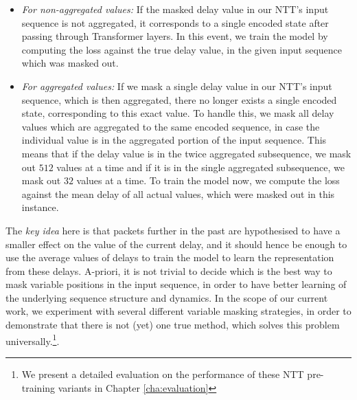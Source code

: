 \begin{itemize}
\item \emph{For non-aggregated values:} If the masked delay value in our NTT's input sequence is not aggregated, it corresponds to a single encoded state after passing through Transformer layers. In this event, we train the model by computing the loss against the true delay value, in the given input sequence which was masked out.
\item \emph{For aggregated values:} If we mask a single delay value in our NTT's input sequence, which is then aggregated, there no longer exists a single encoded state, corresponding to this exact value. To handle this, we mask all delay values which are aggregated to the same encoded sequence, in case the individual value is in the aggregated portion of the input sequence. This means that if the delay value is in the twice aggregated subsequence, we mask out $512$ values at a time and if it is in the single aggregated subsequence, we mask out $32$ values at a time. To train the model now, we compute the loss against the mean delay of all actual values, which were masked out in this instance.
\end{itemize}

The \emph{key idea} here is that packets further in the past are hypothesised to have a smaller effect on the value of the current delay, and it should hence be enough to use the average values of delays to train the model to learn the representation from these delays. A-priori, it is not trivial to decide which is the best way to mask variable positions in the input sequence, in order to have better learning of the underlying sequence structure and dynamics. In the scope of our current work, we experiment with several different variable masking strategies, in order to demonstrate that there is not (yet) one true method, which solves this problem universally.\footnote{We present a detailed evaluation on the performance of these NTT pre-training variants in Chapter \ref{cha:evaluation}}.












